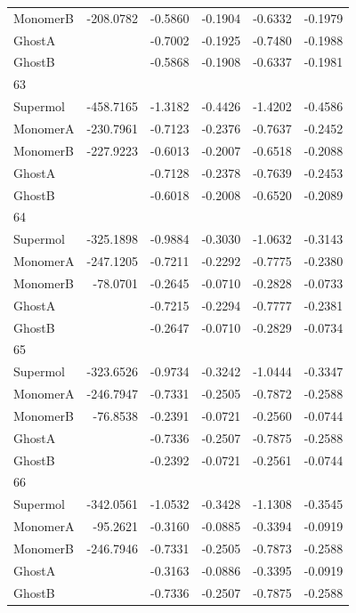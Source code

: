 \documentclass[journal=jctcce,manuscript=article]{achemso}
\begin{document}
\begin{spacing}{1}
\begin{longtable}{lRRRRR}
    MonomerB & -208.0782 & -0.5860 & -0.1904 & -0.6332 & -0.1979 \\
    GhostA &  & -0.7002 & -0.1925 & -0.7480 & -0.1988 \\
    GhostB &  & -0.5868 & -0.1908 & -0.6337 & -0.1981 \\
    63 &  &  &  &  &  \\
    Supermol & -458.7165 & -1.3182 & -0.4426 & -1.4202 & -0.4586 \\
    MonomerA & -230.7961 & -0.7123 & -0.2376 & -0.7637 & -0.2452 \\
    MonomerB & -227.9223 & -0.6013 & -0.2007 & -0.6518 & -0.2088 \\
    GhostA &  & -0.7128 & -0.2378 & -0.7639 & -0.2453 \\
    GhostB &  & -0.6018 & -0.2008 & -0.6520 & -0.2089 \\
    64 &  &  &  &  &  \\
    Supermol & -325.1898 & -0.9884 & -0.3030 & -1.0632 & -0.3143 \\
    MonomerA & -247.1205 & -0.7211 & -0.2292 & -0.7775 & -0.2380 \\
    MonomerB & -78.0701 & -0.2645 & -0.0710 & -0.2828 & -0.0733 \\
    GhostA &  & -0.7215 & -0.2294 & -0.7777 & -0.2381 \\
    GhostB &  & -0.2647 & -0.0710 & -0.2829 & -0.0734 \\
    65 &  &  &  &  &  \\
    Supermol & -323.6526 & -0.9734 & -0.3242 & -1.0444 & -0.3347 \\
    MonomerA & -246.7947 & -0.7331 & -0.2505 & -0.7872 & -0.2588 \\
    MonomerB & -76.8538 & -0.2391 & -0.0721 & -0.2560 & -0.0744 \\
    GhostA &  & -0.7336 & -0.2507 & -0.7875 & -0.2588 \\
    GhostB &  & -0.2392 & -0.0721 & -0.2561 & -0.0744 \\
    66 &  &  &  &  &  \\
    Supermol & -342.0561 & -1.0532 & -0.3428 & -1.1308 & -0.3545 \\
    MonomerA & -95.2621 & -0.3160 & -0.0885 & -0.3394 & -0.0919 \\
    MonomerB & -246.7946 & -0.7331 & -0.2505 & -0.7873 & -0.2588 \\
    GhostA &  & -0.3163 & -0.0886 & -0.3395 & -0.0919 \\
    GhostB &  & -0.7336 & -0.2507 & -0.7875 & -0.2588
\end{longtable}


\end{spacing}
\end{document}
